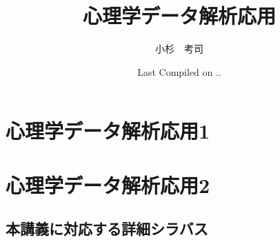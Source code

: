 \documentclass[dvipsnames]{ltjsbook}
\begin{document}


\VerbatimFootnotes
\title{心理学データ解析応用}
\author{小杉　考司}
\date{Last Compiled on \number\year .\number\month .\number\day}
\maketitle
\setcounter{tocdepth}{1}



\tableofcontents

\linenumbers
\part{心理学データ解析応用1}















\part{心理学データ解析応用2}















\appendix


\chapter{本講義に対応する詳細シラバス}






























\nolinenumbers


\printindex
\end{document}
